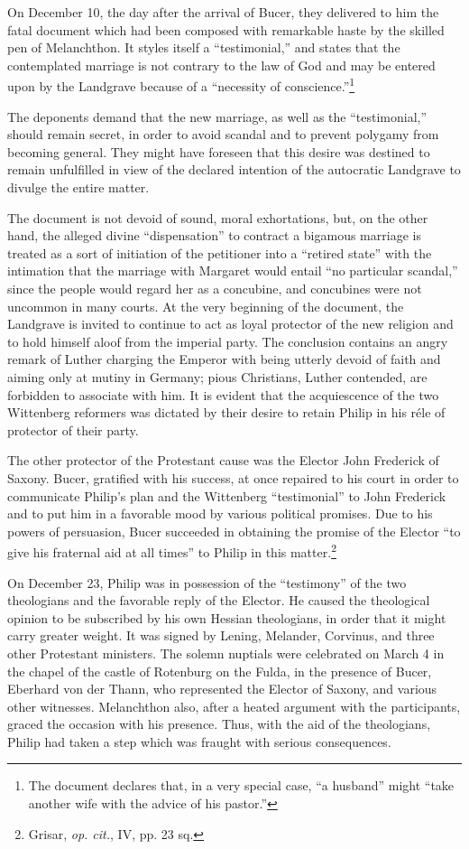 On December 10, the day after the arrival of Bucer, they delivered
to him the fatal document which had been composed with remarkable haste
by the skilled pen of Melanchthon. It styles itself a “testimonial,” and
states that the contemplated marriage is not contrary to
the law of God and may be entered upon by the Landgrave because of
a “necessity of conscience.”\footnote
{The document declares that, in a very special case, “a husband” might ``take another
wife with the advice of his pastor.''}

The deponents demand that the new
marriage, as well as the “testimonial,” should remain secret, in order
to avoid scandal and to prevent polygamy from becoming general.
They might have foreseen that this desire was destined to remain unfulfilled
in view of the declared intention of the autocratic Landgrave
to divulge the entire matter.

The document is not devoid of sound, moral exhortations, but, on the
other hand, the alleged divine “dispensation” to contract a bigamous marriage
is treated as a sort of initiation of the petitioner into a “retired state”
with the intimation that the marriage with Margaret would entail “no particular
scandal,” since the people would regard her as a concubine, and
concubines were not uncommon in many courts. At the very beginning of
the document, the Landgrave is invited to continue to act as loyal protector
of the new religion and to hold himself aloof from the imperial party. The
conclusion contains an angry remark of Luther charging the Emperor with
being utterly devoid of faith and aiming only at mutiny in Germany; pious
Christians, Luther contended, are forbidden to associate with him.
It is evident that the acquiescence of the two Wittenberg reformers was
dictated by their desire to retain Philip in his réle of protector of their party.

The other protector of the Protestant cause was the Elector John
Frederick of Saxony. Bucer, gratified with his success, at once repaired
to his court in order to communicate Philip’s plan and the
Wittenberg ``testimonial'' to John Frederick and to put him in a
favorable mood by various political promises. Due to his powers of
persuasion, Bucer succeeded in obtaining the promise of the Elector
“to give his fraternal aid at all times” to Philip in this matter.\footnote{Grisar, \textit{op. cit.}, IV, pp. 23 sq.}

On December 23, Philip was in possession of the “testimony” of
the two theologians and the favorable reply of the Elector. He caused
the theological opinion to be subscribed by his own Hessian theologians,
in order that it might carry greater weight. It was signed by
Lening, Melander, Corvinus, and three other Protestant ministers. The
solemn nuptials were celebrated on March 4 in the chapel of the castle
of Rotenburg on the Fulda, in the presence of Bucer, Eberhard
von der Thann, who represented the Elector of Saxony, and various
other witnesses. Melanchthon also, after a heated argument with the
participants, graced the occasion with his presence. Thus, with the
aid of the theologians, Philip had taken a step which was fraught
with serious consequences.


